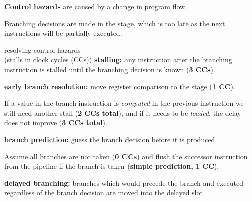 \textbf{Control hazards} are caused by a change in program flow.

Branching decisions are made in the  stage, which is too late as the next instructions will
be partially executed.

\begin{defn}{resolving control hazards \\ (stalls in clock cycles (CCs))}
    \textbf{stalling:} any instruction after the branching instruction is stalled until the branching
    decision is known (\textbf{3 CCs}).

    \textbf{early branch resolution:} move register comparison to the  stage (\textbf{1 CC}).

    If a value in the branch instruction is \textit{computed} in the previous instruction we still need another stall (\textbf{2 CCs total}),
    and if it needs to be \textit{loaded}, the delay does not improve (\textbf{3 CCs total}).

    \textbf{branch prediction:} guess the branch decision before it is produced

    Assume all branches are not taken (\textbf{0 CCs}) and flush the successor instruction
    from the pipeline if the branch is taken (\textbf{simple prediction, 1 CC}).

    \textbf{delayed branching:} branches which would precede the branch and executed regardless of the
    branch decision are moved into the delayed slot
\end{defn}

